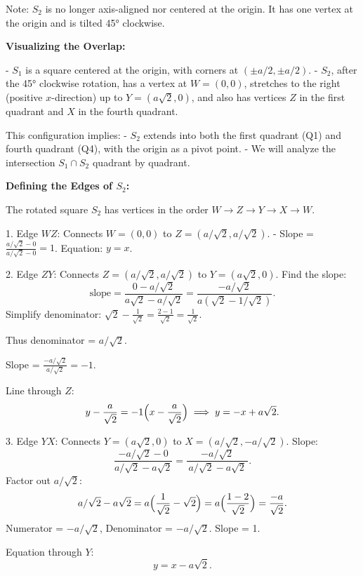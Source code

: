 \documentclass[12pt,a4paper]{article}
\begin{document}
Note: \( S_2 \) is no longer axis-aligned nor centered at the origin. It has one vertex at the origin and is tilted 45° clockwise.

\medskip

\noindent\textbf{Visualizing the Overlap:}

- \( S_1 \) is a square centered at the origin, with corners at \((\pm a/2,\pm a/2)\).
- \( S_2 \), after the 45° clockwise rotation, has a vertex at \(W=(0,0)\), stretches to the right (positive \(x\)-direction) up to \(Y=(a\sqrt{2},0)\), and also has vertices \(Z\) in the first quadrant and \(X\) in the fourth quadrant.

This configuration implies:
- \( S_2 \) extends into both the first quadrant (Q1) and fourth quadrant (Q4), with the origin as a pivot point.
- We will analyze the intersection \( S_1 \cap S_2 \) quadrant by quadrant.

\medskip

\noindent\textbf{Defining the Edges of \( S_2 \):}

The rotated square \( S_2 \) has vertices in the order \( W \to Z \to Y \to X \to W \).

1. Edge \(WZ\): Connects \(W=(0,0)\) to \(Z=(a/\sqrt{2}, a/\sqrt{2})\).
   - Slope = \(\frac{a/\sqrt{2}-0}{a/\sqrt{2}-0}=1\).
   Equation: \(y=x\).

2. Edge \(ZY\): Connects \(Z=(a/\sqrt{2}, a/\sqrt{2})\) to \(Y=(a\sqrt{2},0)\).
   Find the slope:
   \[
   \text{slope} = \frac{0 - a/\sqrt{2}}{a\sqrt{2} - a/\sqrt{2}}
   = \frac{-a/\sqrt{2}}{a(\sqrt{2}-1/\sqrt{2})}.
   \]
   Simplify denominator:
   \(\sqrt{2}-\frac{1}{\sqrt{2}} = \frac{2-1}{\sqrt{2}}=\frac{1}{\sqrt{2}}\).

   Thus denominator = \(a/\sqrt{2}\).

   Slope = \(\frac{-a/\sqrt{2}}{a/\sqrt{2}} = -1\).

   Line through \(Z\):
   \[
   y - \frac{a}{\sqrt{2}} = -1\Bigl(x - \frac{a}{\sqrt{2}}\Bigr) \implies y = -x + a\sqrt{2}.
   \]

3. Edge \(YX\): Connects \(Y=(a\sqrt{2},0)\) to \(X=(a/\sqrt{2}, -a/\sqrt{2})\).
   Slope:
   \[
   \frac{-a/\sqrt{2}-0}{a/\sqrt{2}-a\sqrt{2}}
   = \frac{-a/\sqrt2}{\,a/\sqrt2 - a\sqrt{2}\,}.
   \]
   Factor out \(a/\sqrt{2}\):
   \[
   a/\sqrt{2}-a\sqrt{2} = a\Bigl(\frac{1}{\sqrt{2}}-\sqrt{2}\Bigr) = a\Bigl(\frac{1-2}{\sqrt{2}}\Bigr) = \frac{-a}{\sqrt{2}}.
   \]
   Numerator = \(-a/\sqrt{2}\), Denominator = \(-a/\sqrt{2}\). Slope = 1.

   Equation through \(Y\):
   \[
   y = x - a\sqrt{2}.
   \]
\end{document}

